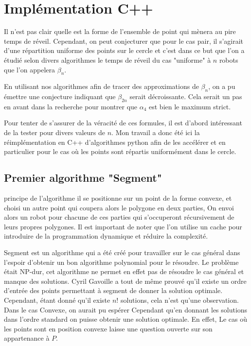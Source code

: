 \section{Implémentation C++}

Il n'est pas clair quelle est la forme de l'ensemble de point qui mènera au pire temps de réveil. Cependant, on peut conjecturer que pour le cas pair, il s'agirait d'une répartition uniforme des points sur le cercle et c'est dans ce but que l'on a étudié selon divers algorithmes le temps de réveil du cas "uniforme" à $n$ robots que l'on appelera $\beta_n$.

En utilisant nos algorithmes afin de tracer des approximations de $\beta_n$, on a pu émettre une conjecture indiquant que $\beta_{2n}$ serait décroissante. Cela serait un pas en avant dans la recherche pour montrer que $\alpha_4$ est bien le maximum strict.

Pour tenter de s'assurer de la véracité de ces formules, il est d'abord intéressant de la tester pour divers valeurs de $n$. Mon travail a donc été ici la réimplémentation en C++ d'algorithmes python afin de les accélérer et en particulier pour le cas où les points sont répartis uniformément dans le cercle.

\subsection{Premier algorithme "Segment"}

\large{principe de l'algorithme} il se positionne sur un point de la forme convexe, et choisi un autre point qui coupera alors le polygone en deux parties, On envoi alors un robot pour chacune de ces parties qui s'occuperont récursivement de leurs propres polygones.
Il est important de noter que l'on utilise un cache pour introduire de la programmation dynamique et réduire la complexité.

Segment est un algorithme qui a été créé pour travailler sur le cas général dans l'espoir d'obtenir un bon algorithme polynomial pour le résoudre. Le problème était NP-dur, cet algorithme ne permet en effet pas de résoudre le cas général et manque des solutions. Cyril Gavoille a tout de même prouvé qu'il existe un ordre d'entrée des points permettant à segment de donner la solution optimale. Cependant, étant donné qu'il existe $n!$ solutions, cela n'est qu'une observation.
Dans le cas Convexe, on aurait pu espérer Cependant qu'en donnant les solutions dans l'ordre standard on puisse obtenir une solution optimale. En effet, Le cas où les points sont en position convexe laisse une question ouverte sur son appartenance à $P$. 

